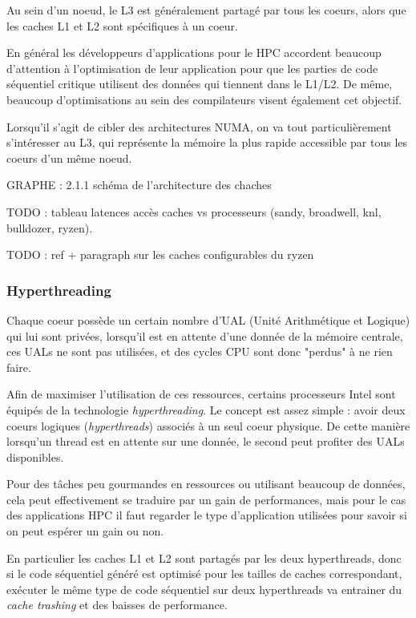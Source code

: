 Au sein d'un noeud, le L3 est généralement partagé par tous les coeurs, alors que les caches L1 et L2 sont spécifiques à un coeur.

En général les développeurs d'applications pour le HPC accordent beaucoup d'attention à l'optimisation de leur application pour que les parties de code séquentiel critique utilisent des données qui tiennent dans le L1/L2.
De même, beaucoup d'optimisations au sein des compilateurs visent également cet objectif.

Lorsqu'il s'agit de cibler des architectures NUMA, on va tout particulièrement s'intéresser au L3, qui représente la mémoire la plus rapide accessible par tous les coeurs d'un même noeud.

GRAPHE : 2.1.1 schéma de l'architecture des chaches

TODO : tableau latences accès caches vs processeurs (sandy, broadwell, knl, bulldozer, ryzen).

TODO : ref + paragraph sur les caches configurables du ryzen

\subsubsection{Hyperthreading}

Chaque coeur possède un certain nombre d'UAL (Unité Arithmétique et Logique) qui lui sont privées, lorsqu'il est en attente d'une donnée de la mémoire centrale, ces UALs ne sont pas utilisées, et des cycles CPU sont donc "perdus" à ne rien faire.

Afin de maximiser l'utilisation de ces ressources, certains processeurs Intel sont équipés de la technologie \emph{hyperthreading}.
Le concept est assez simple : avoir deux coeurs logiques (\emph{hyperthreads}) associés à un seul coeur physique.
De cette manière lorsqu'un thread est en attente sur une donnée, le second peut profiter des UALs disponibles.

Pour des tâches peu gourmandes en ressources ou utilisant beaucoup de données, cela peut effectivement se traduire par un gain de performances, mais pour le cas des applications HPC il faut regarder le type d'application utilisées pour savoir si on peut espérer un gain ou non.

En particulier les caches L1 et L2 sont partagés par les deux hyperthreads, donc si le code séquentiel généré est optimisé pour les tailles de caches correspondant, exécuter le même type de code séquentiel sur deux hyperthreads va entrainer du \emph{cache trashing} et des baisses de performance.

